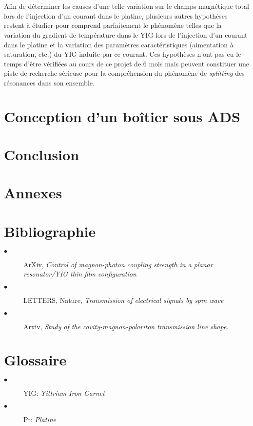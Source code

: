 \documentclass[12pt,fleqn]{book} %
\begin{document}
~\\\\Afin de déterminer les causes d'une telle variation sur le champs magnétique total lors de l'injection d'un courant dans le platine, plusieurs autres hypothèses restent à étudier pour comprend parfaitement le phénomène telles que la variation du gradient de température dans le YIG lors de l'injection d'un courant dans le platine et la variation des paramètres caractéristiques (aimentation à saturation, etc.) du YIG induite par ce courant. Ces hypothèses n'ont pas eu le temps d'être vérifiées au cours de ce projet de 6 mois mais peuvent constituer une piste de recherche sèrieuse pour la compréhension
du phénomène de \emph{splitting} des résonances dans son ensemble.
\part{Conception d'un boîtier sous ADS}
\part{Conclusion}

\setcounter{part}{-5}
\part{Annexes}

\setcounter{part}{-6}
\part{Bibliographie}
\label{Sources}
\appendix
\begin{description}
 \item[$\bullet$] ArXiv, \emph{Control of magnon-photon coupling strength in a planar resonator/YIG thin film configuration}
 \item[$\bullet$] LETTERS, Nature, \emph{Transmission of electrical signals by spin wave}
 \item[$\bullet$] Arxiv, \emph{Study of the cavity-magnon-polariton transmission line shape}.
\end{description}

\setcounter{part}{-7}
\part{Glossaire}
\begin{description}
 \item[$\bullet$] YIG: \emph{Yittrium Iron Garnet}
 \item[$\bullet$] Pt: \emph{Platine}
\end{description}
\end{document}
